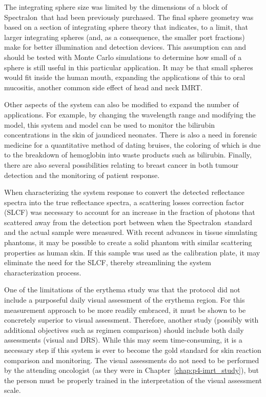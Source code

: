 The integrating sphere size was limited by the dimensions of a block of Spectralon\textregistered~that had been previously purchased. The final sphere geometry was based on a section of integrating sphere theory that indicates, to a limit, that larger integrating spheres (and, as a consequence, the smaller port fractions) make for better illumination and detection devices. This assumption can and should be tested with Monte Carlo simulations to determine how small of a sphere is still useful in this particular application. It may be that small spheres would fit inside the human mouth, expanding the applications of this to oral mucositis, another common side effect of head and neck IMRT.\cite{Hancock2003}

Other aspects of the system can also be modified to expand the number of applications. For example, by changing the wavelength range and modifying the model, this system and model can be used to monitor the bilirubin concentrations in the skin of jaundiced neonates.\cite{Randeberg2005} There is also a need in forensic medicine for a quantitative method of dating bruises,\cite{Randeberg2006} the coloring of which is due to the breakdown of hemoglobin into waste products such as bilirubin. Finally, there are also several possibilities relating to breast cancer in both tumour detection\cite{Peters1990,Tromberg2005} and the monitoring of patient response.\cite{Porock1999,Tromberg2010}

When characterizing the system response to convert the detected reflectance spectra into the true reflectance spectra, a scattering losses correction factor (SLCF) was necessary to account for an increase in the fraction of photons that scattered away from the detection port between when the Spectralon\textregistered~standard and the actual sample were measured. With recent advances in tissue simulating phantoms, it may be possible to create a solid phantom with similar scattering properties as human skin. If this sample was used as the calibration plate, it may eliminate the need for the SLCF, thereby streamlining the system characterization process.

One of the limitations of the erythema study was that the protocol did not include a purposeful daily visual assessment of the erythema region. For this measurement approach to be more readily embraced, it must be shown to be concretely superior to visual assessment. Therefore, another study (possibly with additional objectives such as regimen comparison) should include both daily assessments (visual and DRS). While this may seem time-consuming, it is a necessary step if this system is ever to become the gold standard for skin reaction comparison and monitoring. The visual assessments do not need to be performed by the attending oncologist (as they were in Chapter~\ref{chap:p4-imrt_study}), but the person must be properly trained in the interpretation of the visual assessment scale.


